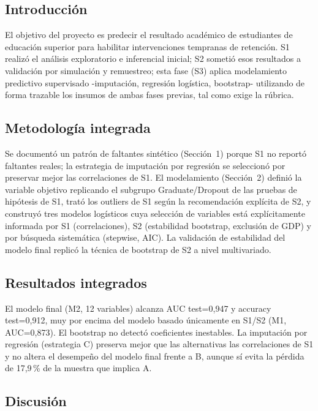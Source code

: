 \documentclass[11pt,a4paper]{article}
\begin{document}
\subsection{Introducción}

El objetivo del proyecto es predecir el resultado académico de estudiantes de educación superior
para habilitar intervenciones tempranas de retención. S1 realizó el análisis exploratorio e
inferencial inicial; S2 sometió esos resultados a validación por simulación y remuestreo; esta
fase (S3) aplica modelamiento predictivo supervisado -imputación, regresión logística, bootstrap-
utilizando de forma trazable los insumos de ambas fases previas, tal como exige la rúbrica.

\subsection{Metodología integrada}

Se documentó un patrón de faltantes sintético (Sección~1) porque S1 no reportó faltantes reales;
la estrategia de imputación por regresión se seleccionó por preservar mejor las correlaciones de
S1. El modelamiento (Sección~2) definió la variable objetivo replicando el subgrupo
Graduate/Dropout de las pruebas de hipótesis de S1, trató los outliers de S1 según la
recomendación explícita de S2, y construyó tres modelos logísticos cuya selección de variables
está explícitamente informada por S1 (correlaciones), S2 (estabilidad bootstrap, exclusión de
GDP) y por búsqueda sistemática (stepwise, AIC). La validación de estabilidad del modelo final
replicó la técnica de bootstrap de S2 a nivel multivariado.

\subsection{Resultados integrados}

El modelo final (M2, 12 variables) alcanza AUC test=0{,}947 y accuracy test=0{,}912, muy por
encima del modelo basado únicamente en S1/S2 (M1, AUC=0{,}873). El bootstrap no detectó
coeficientes inestables. La imputación por regresión (estrategia C) preserva mejor que las
alternativas las correlaciones de S1 y no altera el desempeño del modelo final frente a B, aunque
sí evita la pérdida de 17{,}9\,\% de la muestra que implica A.

\subsection{Discusión}
\end{document}
